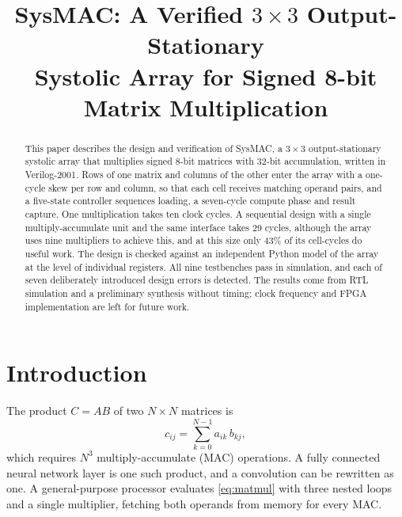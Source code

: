 \documentclass[conference]{IEEEtran}
\begin{document}
\title{SysMAC: A Verified $3 \times 3$ Output-Stationary\\Systolic Array for Signed 8-bit Matrix Multiplication}

\author{}

\maketitle

\begin{abstract}
This paper describes the design and verification of SysMAC, a $3 \times 3$ output-stationary systolic array that multiplies signed 8-bit matrices with 32-bit accumulation, written in Verilog-2001. Rows of one matrix and columns of the other enter the array with a one-cycle skew per row and column, so that each cell receives matching operand pairs, and a five-state controller sequences loading, a seven-cycle compute phase and result capture. One multiplication takes ten clock cycles. A sequential design with a single multiply-accumulate unit and the same interface takes 29 cycles, although the array uses nine multipliers to achieve this, and at this size only 43\% of its cell-cycles do useful work. The design is checked against an independent Python model of the array at the level of individual registers. All nine testbenches pass in simulation, and each of seven deliberately introduced design errors is detected. The results come from RTL simulation and a preliminary synthesis without timing; clock frequency and FPGA implementation are left for future work.
\end{abstract}

\section{Introduction}

The product $C = AB$ of two $N \times N$ matrices is
\begin{equation}
c_{ij} = \sum_{k=0}^{N-1} a_{ik}\, b_{kj},
\label{eq:matmul}
\end{equation}
which requires $N^3$ multiply-accumulate (MAC) operations. A fully connected neural network layer is one such product, and a convolution can be rewritten as one. A general-purpose processor evaluates \eqref{eq:matmul} with three nested loops and a single multiplier, fetching both operands from memory for every MAC.
\end{document}
